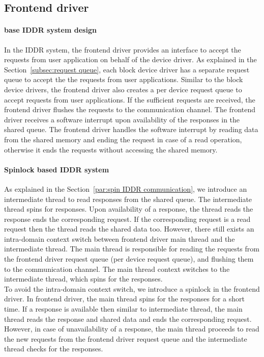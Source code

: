\subsection{Frontend driver}
\paragraph{base IDDR system design}
In the IDDR system, the frontend driver provides an interface to accept the requests from user application on behalf of the device driver. As explained in the Section~\ref{subsec:request queue}, each block device driver has a separate request queue to accept the the requests from user applications. Similar to the block device drivers, the frontend driver also creates a per device request queue to accept requests from user applications. If the sufficient requests are received, the frontend driver flushes the requests to the communication channel. The frontend driver receives a software interrupt upon availability of the responses in the shared queue. The frontend driver handles the software interrupt by reading data from the shared memory and ending the request in case of a read operation, otherwise it ends the requests without accessing the shared memory.

\paragraph{Spinlock based IDDR system}
As explained in the Section~\ref{par:spin IDDR communication}, we introduce an intermediate thread to read responses from the shared queue. The intermediate thread spins for responses. Upon availability of a response, the thread reads the response ends the corresponding request. If the corresponding request is a read request then the thread reads the shared data too. However, there still exists an intra-domain context switch between frontend driver main thread and the intermediate thread. The main thread is responsible for reading the requests from the frontend driver request queue (per device request queue), and flushing them to the communication channel. The main thread context switches to the intermediate thread, which spins for the responses. 
\\[3mm]
To avoid the intra-domain context switch, we introduce a spinlock in the frontend driver. In frontend driver, the main thread spins for the responses for a short time. If a response is available then similar to intermediate thread, the main thread reads the response and shared data and ends the corresponding request. However, in case of unavailability of a response, the main thread proceeds to read the new requests from the frontend driver request queue and the intermediate thread checks for the responses.  

